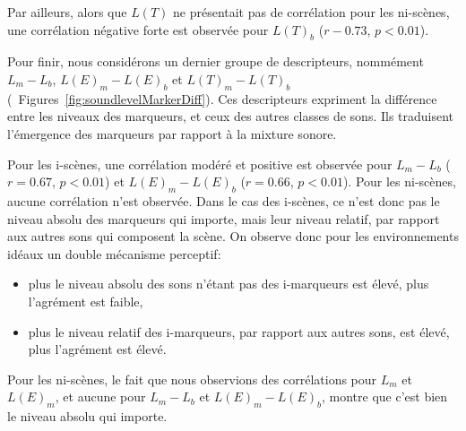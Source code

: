 Par ailleurs, alors que $L(T)$ ne présentait pas de corrélation pour les ni-scènes, une corrélation négative forte est observée pour $L(T)_b$ ($r-0.73$, $p<0.01$). 

Pour finir, nous considérons un dernier groupe de descripteurs, nommément $L_m-L_b$, $L(E)_m-L(E)_b$ et $L(T)_m-L(T)_b$ (\cf~Figures~\ref{fig:soundlevelMarkerDiff}). Ces descripteurs expriment la différence entre les niveaux des marqueurs, et ceux des autres classes de sons. Ils traduisent l'émergence des marqueurs par rapport à la mixture sonore.

Pour les i-scènes, une corrélation modéré et positive est observée pour $L_m-L_b$ ($r=0.67$, $p<0.01$) et $L(E)_m-L(E)_b$ ($r=0.66$, $p<0.01$). Pour les ni-scènes, aucune corrélation n'est observée. Dans le cas des i-scènes, ce n'est donc pas le niveau absolu des marqueurs qui importe, mais leur niveau relatif, par rapport aux autres sons qui composent la scène. On observe donc pour les environnements idéaux un double mécanisme perceptif: 

\begin{itemize}
\item plus le niveau absolu des sons n'étant pas des i-marqueurs est élevé, plus l'agrément est faible,
\item plus le niveau relatif des i-marqueurs, par rapport aux autres sons, est élevé, plus l'agrément est élevé.
\end{itemize}

Pour les ni-scènes, le fait que nous observions des corrélations pour $L_m$ et $L(E)_m$, et aucune pour $L_m-L_b$ et $L(E)_m-L(E)_b$, montre que c'est bien le niveau absolu qui importe.

